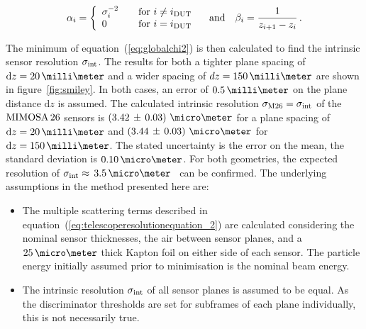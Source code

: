 \begin{equation}
\alpha_i = \left\{
  \begin{array}{l l}
    \sigma_{i}^{-2} & \quad \text{for $i \neq i_{\textrm{DUT}}$}\\
    0 & \quad \text{for $i = i_{\textrm{DUT}}$}
  \end{array} \right. \quad \text{and} \quad \beta_i = \frac{1}{z_{i + 1} - z_i} \,.
\end{equation}

The minimum of equation~(\ref{eq:globalchi2}) is then calculated to find the intrinsic sensor resolution $\sigma_{\textrm{int}}$.
The results for both a tighter plane spacing of $\dz = 20\,\milli\meter$ and a wider spacing of $dz = 150\,\milli\meter$ are shown in figure~\ref{fig:smiley}.
In both cases, an error of $0.5\,\milli\meter$ on the plane distance $\textrm{d}z$ is assumed.
The calculated intrinsic resolution $\sigma_{\textrm{M26}} = \sigma_{\textrm{int}}$ of the $\textrm{MIMOSA\,26}$ sensors is \allowbreak$\left( 3.42\,\pm\, \allowbreak 0.03 \right)\,\micro\meter$
 for a plane spacing of $\textrm{d}z =  20\,\milli\meter$ and $\left( 3.44\,\pm\, \allowbreak 0.03 \right)\,\micro\meter$ for $\textrm{d}z = 150\,\milli\meter$. 
The stated uncertainty is the error on the mean, the standard deviation is $0.10\,\micro\meter$.
For both geometries, the expected resolution of $\sigmai \approx\,3.5\,\micro\meter$~\cite{ref:mimosa26} can be confirmed.
The underlying assumptions in the method presented here are:

\begin{itemize}

\item The multiple scattering terms described in equation~(\ref{eq:telescoperesolutionequation_2}) are calculated considering the nominal sensor thicknesses, the air between sensor planes, and a $25\,\micro\meter$
thick Kapton foil on either side of each sensor.
The particle energy initially assumed prior to minimisation is the nominal beam energy.

\item The intrinsic resolution $\sigma_{\textrm{int}}$ of all sensor planes is assumed to be equal.
As the discriminator thresholds are set for subframes of each plane individually, this is not necessarily true.

\end{itemize}


